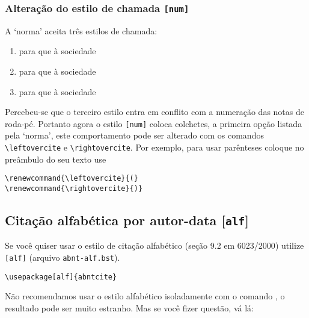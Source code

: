 \documentclass[espacosimples]{abnt}
\begin{document}
\subsubsection{Alteração do estilo de chamada {\tt [num]}}

A `norma'\cite{NBR6023:2000} aceita três estilos de chamada:
\begin{enumerate}
\item para que  à sociedade
\item para que  à sociedade
\item para que  à sociedade
\end{enumerate}
Percebeu-se que o terceiro estilo entra em conflito com a
numeração das notas de roda-pé.
Portanto agora o estilo {\tt [num]} coloca colchetes, a primeira
opção listada pela `norma'\cite{NBR6023:2000}, este comportamento
pode ser alterado com os comandos \verb+\leftovercite+ e
\verb+\rightovercite+.
Por exemplo, para usar parênteses coloque no preâmbulo do seu texto use
\begin{verbatim}
\renewcommand{\leftovercite}{(}
\renewcommand{\rightovercite}{)}
\end{verbatim}

\subsection{Citação alfabética por autor-data [{\tt alf}]}

Se você quiser usar o estilo de citação alfabético
(seção 9.2 em 6023/2000\cite{NBR6023:2000})
utilize {\tt [alf]} (arquivo {\tt abnt-alf.bst}).
\begin{verbatim}
\usepackage[alf]{abntcite}
\end{verbatim}
Não recomendamos usar o estilo alfabético isoladamente com o comando
\verb++, o resultado pode ser muito estranho. Mas se
você fizer questão, vá lá:
\begin{verbatim}

\end{verbatim}
\end{document}
